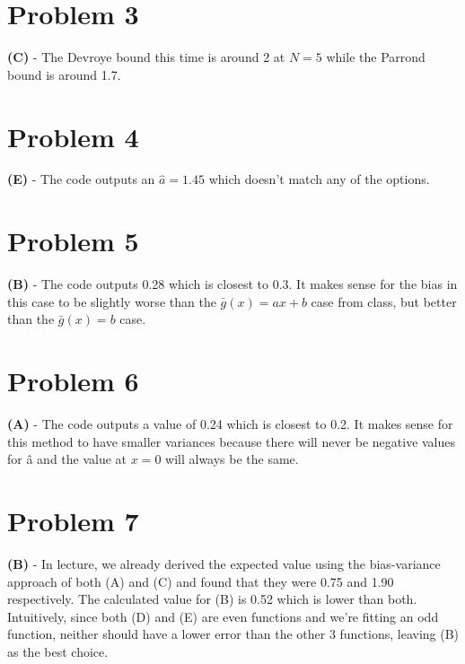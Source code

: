 \documentclass[10pt,letter]{article}
\begin{document}

\section*{Problem 3} 

\textbf{(C)} - The Devroye bound this time is around 2 at $N=5$ while the Parrond bound is around 1.7.

\section*{Problem 4}

\textbf{(E)} - The code outputs an $\hat{a} = 1.45$ which doesn't match any of the options. 

\section*{Problem 5}

\textbf{(B)} - The code outputs 0.28 which is closest to 0.3. It makes sense for the bias in this case to be slightly worse than the $\bar{g}(x) = ax+b$ case from class, but better than the $\bar{g}(x) = b$ case.

\section*{Problem 6}

\textbf{(A)} - The code outputs a value of 0.24 which is closest to 0.2. It makes sense for this method to have smaller variances because there will never be negative values for \^{a} and the value at $x=0$ will always be the same.

\section*{Problem 7}

\textbf{(B)} - In lecture, we already derived the expected value using the bias-variance approach of both (A) and (C) and found that they were 0.75 and 1.90 respectively. The calculated value for (B) is  0.52 which is lower than both. Intuitively, since both (D) and (E) are even functions and we're fitting an odd function, neither should have a lower error than the other 3 functions, leaving (B) as the best choice.
\end{document}
